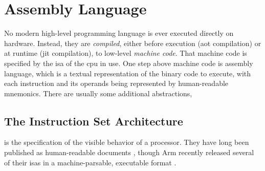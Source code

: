 

\section{Assembly Language}\label{se:assembly_language}
No modern high-level programming language is ever executed directly on hardware.
Instead, they are \emph{compiled},%
either before execution (\ac{aot} compilation) or at runtime (\ac{jit} compilation),
to low-level \emph{machine code}. That machine code is specified
by the \ac{isa} of the \ac{cpu} in use.
One step above machine code is assembly language, which is a textual representation
of the binary code to execute, with each instruction and its operands
being represented by human-readable mnemonics.
There are usually some additional abstractions,

\subsection{The  Instruction Set Architecture}
 is the specification of the visible behavior of a processor.
They have long been published as human-readable documents
\autocite{bowen1985cards,intel2019manual},
though Arm recently released several of their \acp{isa} in a machine-parsable,
executable format \autocite{reid2016arm}.

